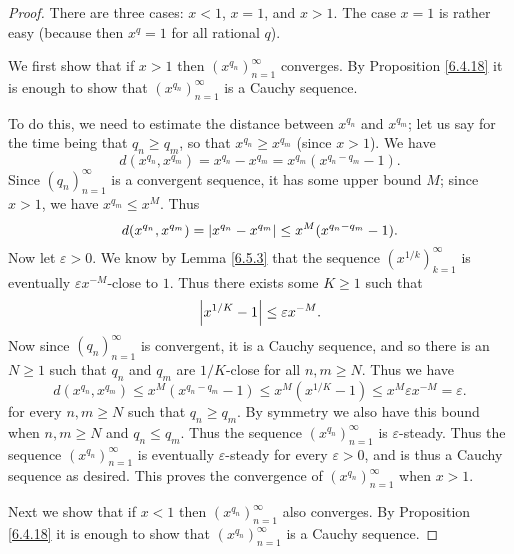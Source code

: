 \begin{proof}
    There are three cases: \(x < 1\), \(x = 1\), and \(x > 1\).
    The case \(x = 1\) is rather easy (because then \(x^q = 1\) for all rational \(q\)).

    We first show that if \(x > 1\) then \((x^{q_n})_{n = 1}^\infty\) converges.
    By Proposition \ref{6.4.18} it is enough to show that \((x^{q_n})_{n = 1}^\infty\) is a Cauchy sequence.

    To do this, we need to estimate the distance between \(x^{q_n}\) and \(x^{q_m}\);
    let us say for the time being that \(q_n \geq q_m\), so that \(x^{q_n} \geq x^{q_m}\) (since \(x > 1\)).
    We have
    \[
        d(x^{q_n}, x^{q_m}) = x^{q_n} - x^{q_m} = x^{q_m} (x^{q_n - q_m} - 1).
    \]
    Since \((q_n)_{n = 1}^\infty\) is a convergent sequence, it has some upper bound \(M\);
    since \(x > 1\), we have \(x^{q_m} \leq x^M\).
    Thus
    \[
        d(x^{q_n}, x^{q_m}) = \abs*{x^{q_n} - x^{q_m}} \leq x^M (x^{q_n - q_m} - 1).
    \]
    Now let \(\varepsilon > 0\).
    We know by Lemma \ref{6.5.3} that the sequence \((x^{1 / k})_{k = 1}^\infty\) is eventually \(\varepsilon x^{-M}\)-close to \(1\).
    Thus there exists some \(K \geq 1\) such that
    \[
        \abs*{x^{1 / K} - 1} \leq \varepsilon x^{-M}.
    \]
    Now since \((q_n)_{n = 1}^\infty\) is convergent, it is a Cauchy sequence, and so there is an \(N \geq 1\) such that \(q_n\) and \(q_m\) are \(1 / K\)-close for all \(n, m \geq N\).
    Thus we have
    \[
        d(x^{q_n}, x^{q_m}) \leq x^M (x^{q_n - q_m} - 1) \leq x^M (x^{1 / K} - 1) \leq x^M \varepsilon x^{-M} = \varepsilon.
    \]
    for every \(n, m \geq N\) such that \(q_n \geq q_m\).
    By symmetry we also have this bound when \(n, m \geq N\) and \(q_n \leq q_m\).
    Thus the sequence \((x^{q_n})_{n = 1}^\infty\) is \(\varepsilon\)-steady.
    Thus the sequence \((x^{q_n})_{n = 1}^\infty\) is eventually \(\varepsilon\)-steady for every \(\varepsilon > 0\), and is thus a Cauchy sequence as desired.
    This proves the convergence of \((x^{q_n})_{n = 1}^\infty\) when \(x > 1\).

    Next we show that if \(x < 1\) then \((x^{q_n})_{n = 1}^\infty\) also converges.
    By Proposition \ref{6.4.18} it is enough to show that \((x^{q_n})_{n = 1}^\infty\) is a Cauchy sequence.


\end{proof}
